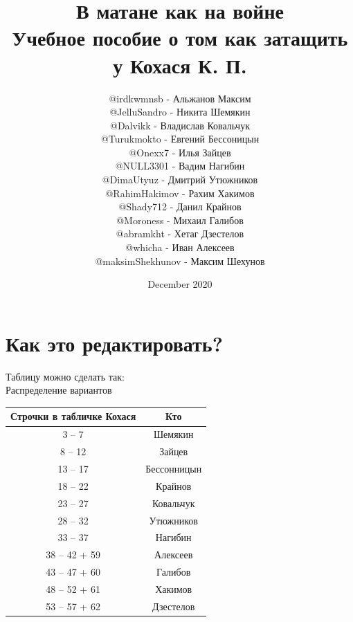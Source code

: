 

\title{\textbf{В матане как на войне} \\ Учебное пособие о том как затащить у Кохася К. П.}
\lhead{}

\author{ 
    @irdkwmnsb - Альжанов Максим   \\%
    @JelluSandro - Никита Шемякин   \\%
    @Dalvikk - Владислав Ковальчук   \\%
    @Turukmokto - Евгений Бессоницын  \\%
    @Onexx7 - Илья Зайцев              \\%
    @NULL3301 - Вадим Нагибин           \\%
    @DimaUtyuz - Дмитрий Утюжников       \\%
    @RahimHakimov - Рахим Хакимов         \\%
    @Shady712 - Данил Крайнов              \\%
    @Moroness - Михаил Галибов              \\%
    @abramkht - Хетаг Дзестелов              \\%
    @whicha - Иван Алексеев                   \\%
    @maksimShekhunov - Максим Шехунов          \\%
}

\date{December 2020}


\maketitle

\newpage
\tableofcontents

\newpage
\section*{Как это редактировать?}

Таблицу можно сделать так: \\
Распределение вариантов \\ 
\begin{tabular}{|c|c|} \hline 
     Строчки в табличке Кохася & Кто \\ \hline 
    3 -- 7 & Шемякин \\ \hline 
    8 -- 12 & Зайцев \\ \hline 
    13 -- 17 & Бессонницын \\ \hline 
    18 -- 22 & Крайнов \\ \hline 
    23 -- 27 & Ковальчук \\ \hline 
    28 -- 32 & Утюжников \\ \hline 
    33 -- 37 & Нагибин \\ \hline  
    38 -- 42 + 59 & Алексеев \\ \hline 
    43 -- 47 + 60 & Галибов \\ \hline 
    48 -- 52 + 61 & Хакимов \\ \hline 
    53 -- 57 + 62 & Дзестелов \\ \hline 
\end{tabular}

